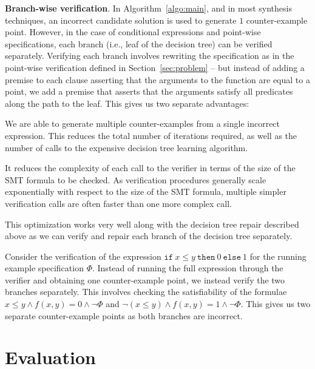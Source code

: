 \documentclass{llncs}
\newcommand\Spec{\Phi}
\newcommand\ITE[3]{\mathtt{if}~#1~\mathtt{then}~#2~\mathtt{else}~#3}
\renewcommand{\paragraph}[1]{\par\noindent\textbf{#1}.}
\begin{document}
\paragraph{Branch-wise verification}
In Algorithm~\ref{algo:main}, and in most synthesis techniques, an
incorrect candidate solution is used to generate $1$ counter-example
point.
However, in the case of conditional expressions and point-wise
specifications, each branch (i.e., leaf of the decision tree) can be
verified separately.
Verifying each branch involves rewriting the specification as in the
point-wise verification defined in Section~\ref{sec:problem} -- but
instead of adding a premise to each clause asserting that the arguments
to the function are equal to a point, we add a premise that asserts that
the arguments satisfy all predicates along the path to the leaf.
This gives us two separate advantages:
\begin{compactitem}
\item We are able to generate multiple counter-examples from a single
  incorrect expression.
  This reduces the total number of iterations required, as well as the
  number of calls to the expensive decision tree learning algorithm.
\item It reduces the complexity of each call to the verifier in terms of
  the size of the SMT formula to be checked.
  As verification procedures generally scale exponentially with respect
  to the size of the SMT formula, multiple simpler verification calls
  are often faster than one more complex call.
\end{compactitem}
This optimization works very well along with the decision tree repair
described above as we can verify and repair each branch of the decision
tree separately.

\begin{example}
  Consider the verification of the expression $\ITE{x \leq y}{0}{1}$
  for the running example specification $\Spec$.
  Instead of running the full expression through the verifier and
  obtaining one counter-example point, we instead verify the two
  branches separately.
  This involves checking the satisfiability of the formulae $x \leq y
  \wedge f(x, y) = 0 \wedge \neg \Spec$ and $\neg (x \leq y) \wedge f(x,
  y) = 1 \wedge \neg \Spec$.
  This gives us two separate counter-example points as both branches are
  incorrect.
\end{example}

\section{Evaluation}
\label{sec:evaluation}
% 
% 
\end{document}

